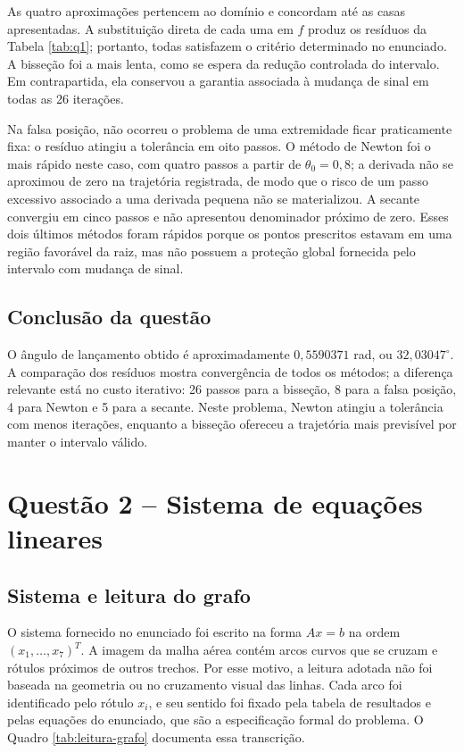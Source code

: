 \documentclass[11pt,a4paper]{article}
\begin{document}
As quatro aproximações pertencem ao domínio e concordam até as casas apresentadas. A substituição direta de cada uma em $f$ produz os resíduos da Tabela \ref{tab:q1}; portanto, todas satisfazem o critério determinado no enunciado. A bisseção foi a mais lenta, como se espera da redução controlada do intervalo. Em contrapartida, ela conservou a garantia associada à mudança de sinal em todas as 26 iterações.

Na falsa posição, não ocorreu o problema de uma extremidade ficar praticamente fixa: o resíduo atingiu a tolerância em oito passos. O método de Newton foi o mais rápido neste caso, com quatro passos a partir de $\theta_0=0,8$; a derivada não se aproximou de zero na trajetória registrada, de modo que o risco de um passo excessivo associado a uma derivada pequena não se materializou. A secante convergiu em cinco passos e não apresentou denominador próximo de zero. Esses dois últimos métodos foram rápidos porque os pontos prescritos estavam em uma região favorável da raiz, mas não possuem a proteção global fornecida pelo intervalo com mudança de sinal.

\subsection{Conclusão da questão}

O ângulo de lançamento obtido é aproximadamente $0,5590371$ rad, ou $32,03047^\circ$. A comparação dos resíduos mostra convergência de todos os métodos; a diferença relevante está no custo iterativo: 26 passos para a bisseção, 8 para a falsa posição, 4 para Newton e 5 para a secante. Neste problema, Newton atingiu a tolerância com menos iterações, enquanto a bisseção ofereceu a trajetória mais previsível por manter o intervalo válido.

\section{Questão 2 -- Sistema de equações lineares}

\subsection{Sistema e leitura do grafo}

O sistema fornecido no enunciado foi escrito na forma $Ax=b$ na ordem $(x_1,\ldots,x_7)^T$. A imagem da malha aérea contém arcos curvos que se cruzam e rótulos próximos de outros trechos. Por esse motivo, a leitura adotada não foi baseada na geometria ou no cruzamento visual das linhas. Cada arco foi identificado pelo rótulo $x_i$, e seu sentido foi fixado pela tabela de resultados e pelas equações do enunciado, que são a especificação formal do problema. O Quadro \ref{tab:leitura-grafo} documenta essa transcrição.
\end{document}

